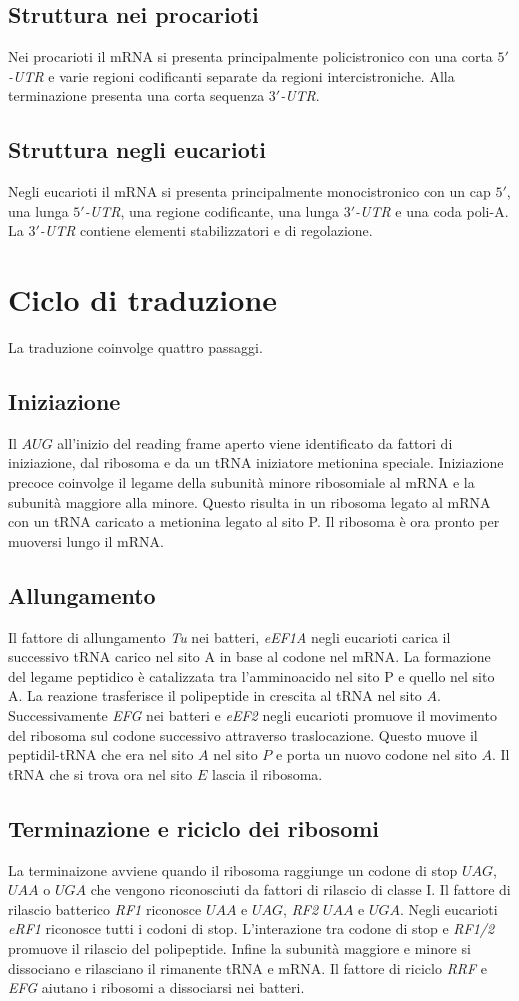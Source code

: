 \subsection{Struttura nei procarioti}
Nei procarioti il mRNA si presenta principalmente policistronico con una corta \emph{$5'$-UTR} e varie regioni codificanti separate da regioni intercistroniche. Alla terminazione presenta una 
corta sequenza \emph{$3'$-UTR}. 
\subsection{Struttura negli eucarioti}
Negli eucarioti il mRNA si presenta principalmente monocistronico con un cap $5'$, una lunga \emph{$5'$-UTR}, una regione codificante, una lunga \emph{$3'$-UTR} e una coda poli-A. La \emph{$3'$-UTR} 
contiene elementi stabilizzatori e di regolazione. 
\section{Ciclo di traduzione}
La traduzione coinvolge quattro passaggi. 
\subsection{Iniziazione}
Il $AUG$ all'inizio del reading frame aperto viene identificato da fattori di iniziazione, dal ribosoma e da un tRNA iniziatore metionina speciale. Iniziazione precoce coinvolge il legame della
subunit\`a minore ribosomiale al mRNA e la subunit\`a maggiore alla minore. Questo risulta in un ribosoma legato al mRNA con un tRNA caricato a metionina legato al sito P. Il ribosoma \`e ora pronto
per muoversi lungo il mRNA. 
\subsection{Allungamento}
Il fattore di allungamento \emph{Tu} nei batteri, \emph{eEF1A} negli eucarioti carica il successivo tRNA carico nel sito A in base al codone nel mRNA. La formazione del legame peptidico \`e catalizzata
tra l'amminoacido nel sito P e quello nel sito A. La reazione trasferisce il polipeptide in crescita al tRNA nel sito $A$. Successivamente \emph{EFG} nei batteri e \emph{eEF2} negli eucarioti promuove
il movimento del ribosoma sul codone successivo attraverso traslocazione. Questo muove il peptidil-tRNA che era nel sito $A$ nel sito $P$ e porta un nuovo codone nel sito $A$. Il tRNA che si trova
ora nel sito $E$ lascia il ribosoma.
\subsection{Terminazione e riciclo dei ribosomi}
La terminaizone avviene quando il ribosoma raggiunge un codone di stop $UAG$, $UAA$ o $UGA$ che vengono riconosciuti da fattori di rilascio di classe I. Il fattore di rilascio batterico \emph{RF1} 
riconosce $UAA$ e $UAG$, \emph{RF2} $UAA$ e $UGA$. Negli eucarioti \emph{eRF1} riconosce tutti i codoni di stop. L'interazione tra codone di stop e \emph{RF1/2} promuove il rilascio del polipeptide. 
Infine la subunit\`a maggiore e minore si dissociano e rilasciano il rimanente tRNA e mRNA. Il fattore di riciclo \emph{RRF} e \emph{EFG} aiutano i ribosomi a dissociarsi nei batteri.
